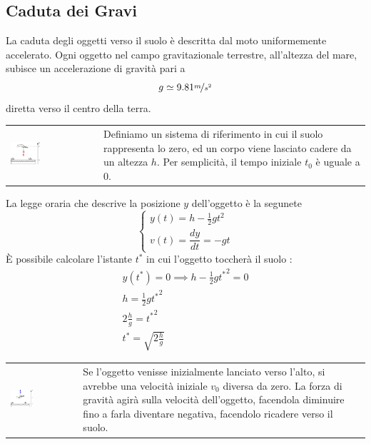 \documentclass[10pt, letterpaper]{report}
\begin{document}
\subsection{Caduta dei Gravi}
La caduta degli oggetti verso il suolo è descritta dal moto uniformemente 
        accelerato. Ogni oggetto nel campo gravitazionale terrestre, all'altezza del mare, subisce un 
        accelerazione di gravità pari a 
        $$ g\simeq 9.81 \nicefrac{m}{s^2}$$ 
        diretta verso il centro della terra. 
\begin{center}
	\begin{tabular}{>{\centering\arraybackslash}m{3in}>{\centering\arraybackslash}m{3in}}
        \includegraphics[width=0.35\textwidth]{images/oggettoLasciatoCadere.eps} & Definiamo un sistema di riferimento in cui il suolo 
        rappresenta lo zero, ed un corpo viene lasciato cadere da un altezza $h$. Per semplicità, 
        il tempo iniziale $t_0$ è uguale a $0$.
		\\
	\end{tabular}
\end{center}
La legge oraria che descrive la posizione $y$ dell'oggetto è la segunete 
$$ \begin{cases}
    y(t)=h-\frac{1}{2}gt^2 \\ 
    v(t)=\dfrac{dy}{dt}=-gt
\end{cases}$$
È possibile calcolare l'istante $t^*$ in cui l'oggetto toccherà il suolo : 
\begin{eqnarray} y(t^*)=0\implies h-\frac{1}{2}g{t^*}^2 =0 \\ 
     h=\frac{1}{2}g{t^*}^2 \\ 
     2\frac{h}{g}={t^*}^2 \\ 
     t^*=\sqrt{2\frac{h}{g}}
\end{eqnarray}
\begin{center}
	\begin{tabular}{>{\centering\arraybackslash}m{3in}>{\centering\arraybackslash}m{3in}}
        \includegraphics[width=0.35\textwidth]{images/graveCaduta2.eps} & Se l'oggetto venisse inizialmente lanciato verso l'alto, si avrebbe una velocità iniziale 
        $v_0$ diversa da zero. La forza di gravità agirà sulla velocità dell'oggetto, facendola diminuire fino a farla 
        diventare negativa, facendolo ricadere verso il suolo.
		\\
	\end{tabular}
\end{center}
\end{document}
